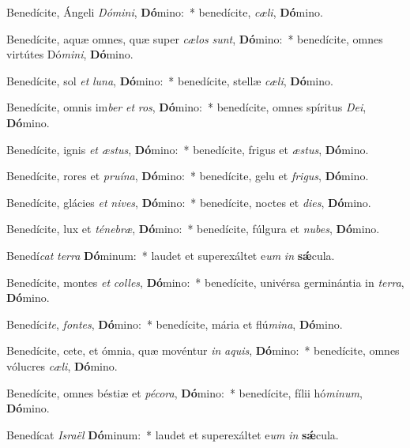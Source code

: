\item Benedícite, Ángeli \textit{Dó}\textit{mi}\textit{ni}, \textbf{Dó}mino:~* benedícite, \textit{cæ}\textit{li}, \textbf{Dó}mino.
\item Benedícite, aquæ omnes, quæ super \textit{cæ}\textit{los} \textit{sunt}, \textbf{Dó}mino:~* benedícite, omnes virtútes Dó\textit{mi}\textit{ni}, \textbf{Dó}mino.
\item Benedícite, sol \textit{et} \textit{lu}\textit{na}, \textbf{Dó}mino:~* benedícite, stellæ \textit{cæ}\textit{li}, \textbf{Dó}mino.
\item Benedícite, omnis im\textit{ber} \textit{et} \textit{ros}, \textbf{Dó}mino:~* benedícite, omnes spíritus \textit{De}\textit{i}, \textbf{Dó}mino.
\item Benedícite, ignis \textit{et} \textit{æs}\textit{tus}, \textbf{Dó}mino:~* benedícite, frigus et \textit{æs}\textit{tus}, \textbf{Dó}mino.
\item Benedícite, rores et \textit{pru}\textit{í}\textit{na}, \textbf{Dó}mino:~* benedícite, gelu et \textit{fri}\textit{gus}, \textbf{Dó}mino.
\item Benedícite, glácies \textit{et} \textit{ni}\textit{ves}, \textbf{Dó}mino:~* benedícite, noctes et \textit{di}\textit{es}, \textbf{Dó}mino.
\item Benedícite, lux et \textit{té}\textit{ne}\textit{bræ}, \textbf{Dó}mino:~* benedícite, fúlgura et \textit{nu}\textit{bes}, \textbf{Dó}mino.
\item Benedí\textit{cat} \textit{ter}\textit{ra} \textbf{Dó}minum:~* laudet et superexáltet e\textit{um} \textit{in} \textbf{sǽ}cula.
\item Benedícite, montes \textit{et} \textit{col}\textit{les}, \textbf{Dó}mino:~* benedícite, univérsa germinántia in \textit{ter}\textit{ra}, \textbf{Dó}mino.
\item Benedíci\textit{te}, \textit{fon}\textit{tes}, \textbf{Dó}mino:~* benedícite, mária et flú\textit{mi}\textit{na}, \textbf{Dó}mino.
\item Benedícite, cete, et ómnia, quæ movéntur \textit{in} \textit{a}\textit{quis}, \textbf{Dó}mino:~* benedícite, omnes vólucres \textit{cæ}\textit{li}, \textbf{Dó}mino.
\item Benedícite, omnes béstiæ et \textit{pé}\textit{co}\textit{ra}, \textbf{Dó}mino:~* benedícite, fílii hó\textit{mi}\textit{num}, \textbf{Dó}mino.
\item Benedícat \textit{Is}\textit{ra}\textit{ël} \textbf{Dó}minum:~* laudet et superexáltet e\textit{um} \textit{in} \textbf{sǽ}cula.

